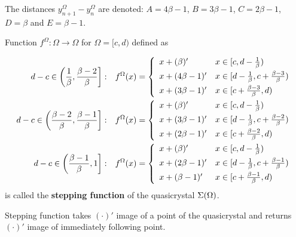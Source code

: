 \documentclass[text.tex]{subfiles}
\begin{document}
\begin{definition}
\label{def:distancesNotation}
The distances $y_{n+1}^\Omega-y_n^\Omega$ are denoted: $A = 4\beta-1$, $B = 3\beta-1$, $C = 2\beta-1$, $D = \beta$ and $E = \beta-1$.
\end{definition}

\begin{definition}
\label{def:steppingFunction}
Function $f^\Omega: \Omega \to \Omega$ for $\Omega = [c,d)$ defined as

\begin{align*}
d-c \in \left( \frac{1}{\beta}, \frac{\beta - 2}{\beta} \right]:& \quad
		f^\Omega(x) = \left\{ \begin{array}{l l}
			x + (\beta)' 	& x\in [c,d-\frac{1}{\beta})\\[1.5mm]
			x + (4\beta-1)' & x\in [d-\frac{1}{\beta},c+\frac{\beta - 3}{\beta})\\[1.5mm]
			x + (3\beta-1)' & x\in [c+\frac{\beta - 3}{\beta},d)
		\end{array} \right.
\\
d-c \in \left( \frac{\beta-2}{\beta}, \frac{\beta-1}{\beta} \right]:& \quad
		f^\Omega(x) = \left\{ \begin{array}{l l}
			x + (\beta)' 	& x\in [c,d-\frac{1}{\beta})\\[1.5mm]
			x + (3\beta-1)' & x\in [d-\frac{1}{\beta},c+\frac{\beta - 2}{\beta})\\[1.5mm]
			x + (2\beta-1)' & x\in [c+\frac{\beta - 2}{\beta},d)
		\end{array} \right.
\\
d-c \in \left( \frac{\beta-1}{\beta}, 1 \right]:& \quad
		f^\Omega(x) = \left\{ \begin{array}{l l}
			x + (\beta)' 	& x\in [c,d-\frac{1}{\beta})\\[1.5mm]
			x + (2\beta-1)' & x\in [d-\frac{1}{\beta},c+\frac{\beta - 1}{\beta})\\[1.5mm]
			x + (\beta-1)' & x\in [c+\frac{\beta - 1}{\beta},d)
		\end{array} \right.
\end{align*}
is called the \textbf{stepping function} of the quasicrystal $\Sigma(\Omega)$. 
\end{definition}

\begin{remark}
Stepping function takes $(\cdot)'$ image of a point of the quasicrystal and returns $(\cdot)'$ image of immediately following point.\\
\end{remark}
\end{document}
